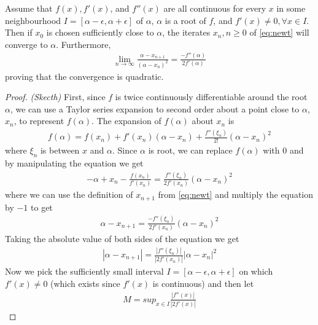 \documentclass[
  digital, %
  table,   %
  nolof,     %
  nolot,     %
	draft, %
]{fithesis3}
\begin{document}
\begin{theorem}
  Assume that $f(x), f'(x)$, and $f''(x)$ are all continuous for every $x$ in some neighbourhood $I = [\alpha - \epsilon, \alpha + \epsilon]$ of $\alpha$, $\alpha$ is a root of $f$, and $f'(x) \neq 0, \forall x \in I$. Then if $x_{0}$ is chosen sufficiently close to $\alpha$, the iterates $x_{n}, n \geq 0$ of \eqref{eq:newt} will converge to $\alpha$. 
Furthermore,
\begin{align} 
 \lim_{n\to\infty} \frac{\alpha - x_{n+1}}{(\alpha - x_{n})^2} = \frac{-f''(\alpha)}{2f'(\alpha)}
\end{align}
proving that the convergence is quadratic.
\end{theorem}
\begin{proof}
\textit{(Skecth)} First, since $f$ is twice continuously differentiable around the root $\alpha$, we can use a Taylor series expansion\parencite[p.~59]{rootApproxMeth} to second order about a point close to $\alpha$, $x_{n}$, to represent $f(\alpha)$. The expansion of $f(\alpha)$ about $x_{n}$ is 
\begin{align}
	f(\alpha) = f(x_{n}) + f'(x_{n})(\alpha - x_{n}) + \frac{f''(\xi_{n})}{2!}(\alpha - x_{n})^2
\end{align}
where $\xi_{n}$ is between $x$ and $\alpha$. Since $\alpha$ is root, we can replace $f(\alpha)$ with $0$ and by manipulating the equation we get
\begin{align}
  -\alpha + x_{n}	- \frac{f(x_{n})}{f'(x_{n})} = \frac{f''(\xi_{n})}{2f'(x_{n})}(\alpha - x_{n})^2
\end{align}
where we can use the definition of $x_{n+1}$ from \eqref{eq:newt} and multiply the equation by $-1$ to get
\begin{align}
  \alpha - x_{n+1} = \frac{-f''(\xi_{n})}{2f'(x_{n})}(\alpha - x_{n})^2 
\end{align}
Taking the absolute value of both sides of the equation we get
\begin{align}
  \left|\alpha - x_{n+1}\right| = \frac{\left|f''(\xi_{n})\right|}{\left|2f'(x_{n})\right|}\left|\alpha - x_{n}\right|^2 
	\label{eq:newtcp}
\end{align}
Now we pick the sufficiently small interval $I = [\alpha - \epsilon, \alpha + \epsilon]$ on which $f'(x) \neq 0$ (which exists since $f'(x)$ is continuous) and then let
\begin{align}
  M = sup_{x\in I}\frac{\left|f''(x)\right|}{\left|2f'(x)\right|}
\end{align}

\end{proof}
\end{document}
